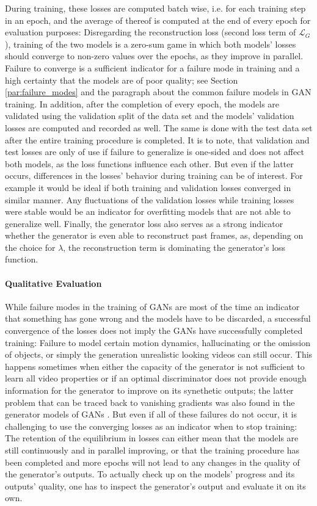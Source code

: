 During training, these losses are computed batch wise, i.e. for each training step in an epoch, and the average of thereof is computed at the end of every epoch for evaluation purposes: Disregarding the reconstruction loss (second loss term of $\mathcal{L}_G$), training of the two models is a zero-sum game in which both models' losses should converge to non-zero values over the epochs, as they improve in parallel. Failure to converge is a sufficient indicator for a failure mode in training and a high certainty that the models are of poor quality; see Section \ref{par:failure_modes} and the paragraph about the common failure models in GAN training. In addition, after the completion of every epoch, the models are validated using the validation split of the data set and the models' validation losses are computed and recorded as well. The same is done with the test data set after the entire training procedure is completed. It is to note, that validation and test losses are only of use if failure to generalize is one-sided and does not affect both models, as the loss functions influence each other. But even if the latter occurs, differences in the losses' behavior during training can be of interest. For example it would be ideal if both training and validation losses converged in similar manner. Any fluctuations of the validation losses while training losses were stable would be an indicator for overfitting models that are not able to generalize well. Finally, the generator loss also serves as a strong indicator whether the generator is even able to reconstruct past frames, as, depending on the choice for $\lambda$, the reconstruction term is dominating the generator's loss function.

\paragraph{Qualitative Evaluation} \label{par:cvgan_eval_method_qual}
While failure modes in the training of GANs are most of the time an indicator that something has gone wrong and the models have to be discarded, a successful convergence of the losses does not imply the GANs have successfully completed training: Failure to model certain motion dynamics, hallucinating or the omission of objects, or simply the generation unrealistic looking videos can still occur. This happens sometimes when either the capacity of the generator is not sufficient to learn all video properties or if an optimal discriminator does not provide enough information for the generator to improve on its synethetic outputs; the latter problem that can be traced back to vanishing gradients was also found in the generator models of GANs \cite{arjovsky2017towards}. But even if all of these failures do not occur, it is challenging to use the converging losses as an indicator when to stop training: The retention of the equilibrium in losses can either mean that the models are still continuously and in parallel improving, or that the training procedure has been completed and more epochs will not lead to any changes in the quality of the generator's outputs. To actually check up on the models' progress and its outputs' quality, one has to inspect the generator's output and evaluate it on its own.

